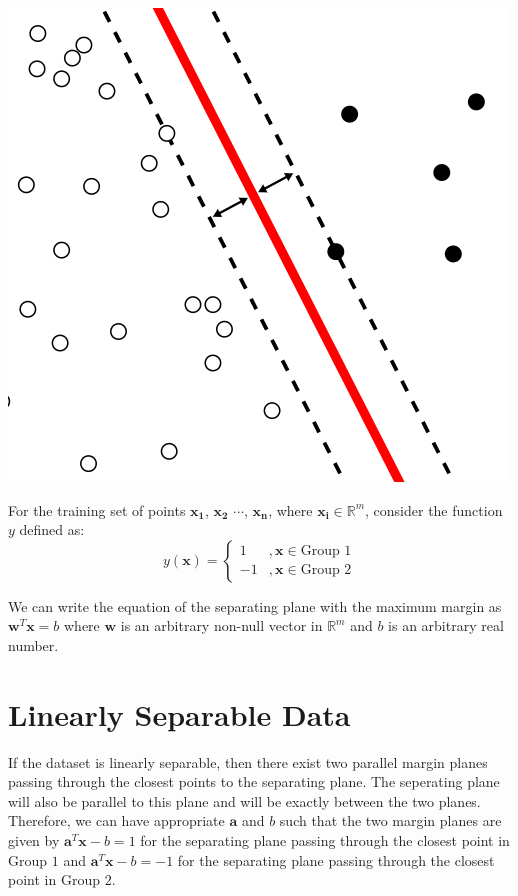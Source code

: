 \documentclass[12 pt]{report}
\begin{document}
    \begin{center}
        \includegraphics[scale = 1.2]{margin.png}
    \end{center}
    

    For the training set of points $\bm{x_{1}}$, $\bm{x_{2}}$ $\cdots$, $\bm{x_{n}}$, where $\bm{x_{i}} \in \mathbb{R}^{m}$, consider the function 
    $y$ defined as:
    \begin{equation}
        y(\bm{x}) = \begin{cases}
            1 &, \bm{x} \in \text{Group 1} \\
            -1 &, \bm{x} \in \text{Group 2}
        \end{cases}
    \end{equation}

    We can write the equation of the separating plane with the maximum margin as $\bm{w}^{T}\bm{x} = b$ where $\bm{w}$ is an arbitrary non-null vector in 
    $\mathbb{R}^{m}$ and $b$ is an arbitrary real number.

    \section{Linearly Separable Data}
    If the dataset is linearly separable, then there exist two parallel margin planes passing through the closest points to the separating plane.
    The seperating plane will also be parallel to this plane and will be exactly between the two planes. Therefore, we can have appropriate $\bm{a}$ 
    and $b$ such that the two margin planes are given by $\bm{a}^{T}\bm{x} - b = 1$ for the separating plane passing through the closest point in 
    Group $1$ and $\bm{a}^{T}\bm{x} - b = -1$ for the separating plane passing through the closest point in Group $2$.
\end{document}

